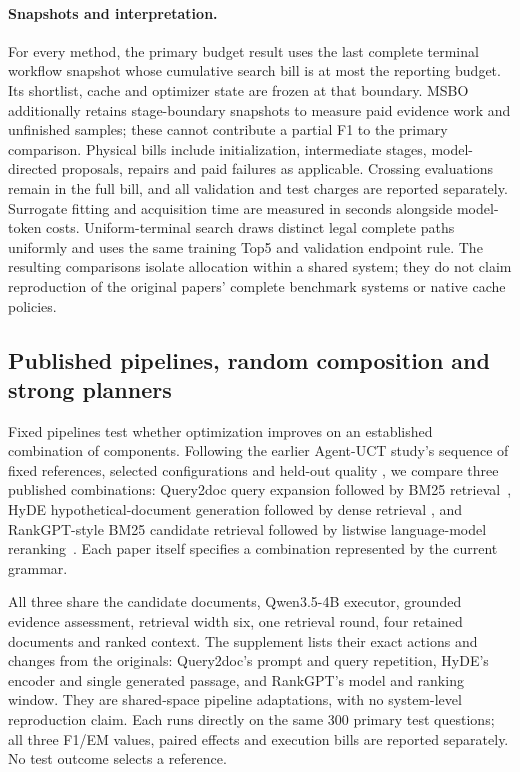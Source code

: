\paragraph{Snapshots and interpretation.}
For every method, the primary budget result uses the last complete terminal
workflow snapshot whose cumulative search bill is at most the reporting
budget. Its shortlist, cache and optimizer state are frozen at that boundary.
MSBO additionally retains stage-boundary snapshots to measure paid evidence
work and unfinished samples; these cannot contribute a partial F1 to the
primary comparison. Physical bills include initialization, intermediate
stages, model-directed proposals, repairs and paid failures as applicable.
Crossing evaluations remain in the full bill, and all validation and test
charges are reported separately. Surrogate fitting and acquisition time are
measured in seconds alongside model-token costs. Uniform-terminal search
draws distinct legal complete paths uniformly and uses the same training
Top5 and validation endpoint rule. The resulting comparisons isolate
allocation within a shared system; they do not claim reproduction of the
original papers' complete benchmark systems or native cache policies.

\subsection{Published pipelines, random composition and strong planners}
\label{sec:workflow-references}
Fixed pipelines test whether optimization improves on an established
combination of components. Following the earlier Agent-UCT study's sequence
of fixed references, selected configurations and held-out quality
\citep{li2026agentuct}, we compare three published combinations: Query2doc
query expansion followed by BM25 retrieval~\citep{wang2023query2doc}, HyDE
hypothetical-document generation followed by dense retrieval
\citep{gao2023hyde}, and RankGPT-style BM25 candidate retrieval followed by
listwise language-model reranking~\citep{sun2023rankgpt}. Each paper itself
specifies a combination represented by the current grammar.

All three share the candidate documents, Qwen3.5-4B executor, grounded
evidence assessment, retrieval width six, one retrieval round, four retained
documents and ranked context. The supplement lists their exact actions and
changes from the originals: Query2doc's prompt and query repetition,
HyDE's encoder and single generated passage, and RankGPT's model and ranking
window. They are shared-space pipeline adaptations, with no system-level
reproduction claim. Each runs directly on the same 300 primary test
questions; all three F1/EM values, paired effects and execution bills are
reported separately. No test outcome selects a reference.

